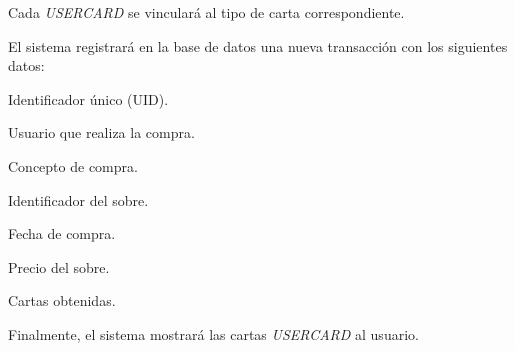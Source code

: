 \begin{RFSobres}
\begin{RFSobres}
		\item Cada \textit{USERCARD} se vinculará al tipo de carta correspondiente.
		\item El sistema registrará en la base de datos una nueva transacción con los siguientes datos:
		\begin{RFSobres}
			\item Identificador único (UID).
			\item Usuario que realiza la compra.
			\item Concepto de compra.
			\item Identificador del sobre.
			\item Fecha de compra.
			\item Precio del sobre.
			\item Cartas obtenidas.
		\end{RFSobres}
		\item Finalmente, el sistema mostrará las cartas \textit{USERCARD} al usuario.
	\end{RFSobres}
\end{RFSobres}
